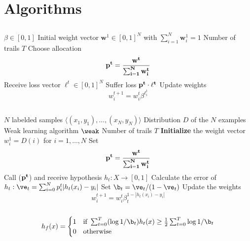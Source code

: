 
\chapter{Algorithms}
\label{app:algo}

\section{\hedge}
\label{app:hedge}

\begin{algorithm}
\caption{\hedge}
\begin{algorithmic}[1]
\Require 
\Statex $\beta\in [0,1]$
\Statex Initial weight vector $\mathbf{w}^1\in [0,1]^N$ with $\sum_{i=1}^N \mathbf{w}^1_i=1$
\Statex Number of trails $T$
\State Choose allocation $$\bf p^t= \frac{\bf w^t}{\sum_{i=1}^N \mathbf{w}^t_i}$$
\State Receive loss vector $\ell^t\in[0,1]^N$
\State Suffer loss $\bf p^t\cdot \ell^t$
\State Update weights $$w^{t+1}_i=w^t_i\beta^{\ell_{i}^{t}}$$
\EndFor
\EndProcedure
\end{algorithmic}
\end{algorithm}
\newpage
\section{\adaB}
\label{app:adaB}

\begin{algorithm} 
\caption{\adaB}
\begin{algorithmic}[1]
\Require 
\Statex $N$ labelded samples $\langle (x_1,y_1),\ldots,(x_N,y_N)\rangle$
\Statex Distribution $D$ of the $N$ examples
\Statex Weak learning algorithm $\weak$
\Statex Number of trails $T$
\State \textbf{Initialize} the weight vector $w_i^1=D(i)$ for $i=1,\ldots,N$
\State Set $$\bf p^t= \frac{\bf w^t}{\sum_{i=1}^N \mathbf{w}^t_i}$$
\State Call \weak($\bf p^t$) and receive hypothesis $h_t:X\to [0,1]$
\State Calculate the error of $h_t:\ve_t=\sum^N_{i=0}p^t_i|h_t(x_i)-y_i|$
\State Set $\b_t=\ve_t/(1-\ve_t)$
\State Update the weights $$w^{t+1}_i=w^t_i\beta^{1-|h_t(x_i)-y_i|}_t$$
\EndFor\\
\Return $$h_f(x)=\begin{cases}1 & \text{if } \sum^T_{t=0}(\log1/\b_t)h_t(x)\geq\frac12\sum^T_{t=0}\log1/\b_t\\0&\text{otherwise}\end{cases}$$
\EndProcedure
\end{algorithmic}
\end{algorithm}